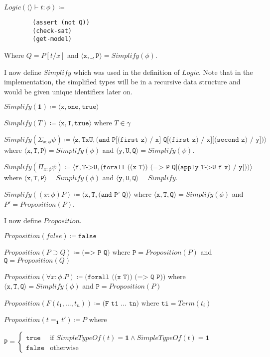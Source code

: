 \documentclass[12pt,a4paper,titlepage]{article}
\newcommand{\lnc}[1]{Logic(\langle \rangle \vdash #1)}
\newcommand{\triple}[3]{\langle \texttt{#1} , \texttt{#2} , \texttt{#3} \rangle}
\begin{document}
    $\lnc{t: \phi} \coloneqq$
    \begin{verbatim}
        (assert (not Q))
        (check-sat)
        (get-model)
    \end{verbatim}
    Where $Q = P[t/x]$ and $\triple{x}{\_}{P} = Simplify(\phi)$.

    I now define $Simplify$ which was used in the definition of $Logic$.
    Note that in the implementation, the simplified types will be in a recursive data structure and would
    be given unique identifiers later on.

    $Simplify(\textbf{1}) \coloneqq \triple{x}{one}{true}$

    $Simplify(T) \coloneqq \triple{x}{T}{true}$ where $T \in \gamma$

    $Simplify(\Sigma_{x:\phi} \psi) \coloneqq
    \triple{z}{TxU}{(and P[(first z) / x] Q[(first z) / x][(second z) / y])}$
    where $\triple{x}{T}{P} = Simplify(\phi)$ and $\triple{y}{U}{Q} = Simplify(\psi)$.

    $Simplify(\Pi_{x: \phi} \psi) \coloneqq
    \triple{f}{T->U}{(forall ((x T)) (=> P Q[(apply\_T->U f x) / y]))}$
    where $\triple{x}{T}{P} = Simplify(\phi)$ and $\triple{y}{U}{Q} = Simplify$.

    $Simplify((x: \phi)P) \coloneqq
    \triple{x}{T}{(and P' Q)}$
    where $\triple{x}{T}{Q} = Simplify(\phi)$ and $P' = Proposition(P)$.

    I now define $Proposition$.

    $Proposition(false) \coloneqq \texttt{false}$

    $Proposition(P \supset Q) \coloneqq \texttt{(=> P Q)}$
    where $\texttt{P} = Proposition(P)$ and $\texttt{Q} = Proposition(Q)$

    $Proposition(\forall x: \phi . P) \coloneqq \texttt{(forall ((x T)) (=> Q P))}$
    where $\triple{x}{T}{Q} = Simplify(\phi)$ and $\texttt{P} = Proposition(P)$

    $Proposition(F(t_1, ..., t_n)) \coloneqq \texttt{(F t1 ... tn)}$
    where $\texttt{ti} = Term(t_i)$

    $Proposition(t =_\textbf{1} t') \coloneqq P$
    where

    $\texttt{P} = \begin{cases}
        \texttt{true} & \text{if } SimpleTypeOf(t)=\textbf{1} \land SimpleTypeOf(t)=\textbf{1}\\
        \texttt{false} & \text{otherwise}
    \end{cases}$
\end{document}
